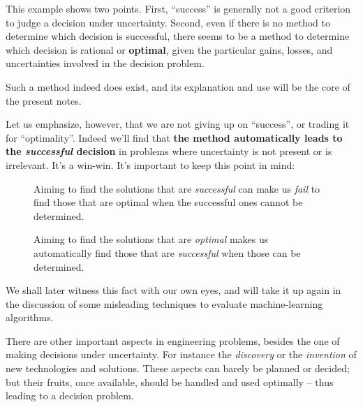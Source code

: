 \documentclass[
  a4paper,
  DIV=11,
  numbers=noendperiod,
  oneside]{scrreprt}
\begin{document}
This example shows two points. First, ``success'' is generally not a
good criterion to judge a decision under uncertainty. Second, even if
there is no method to determine which decision is successful, there
seems to be a method to determine which decision is rational or
{\textbf{optimal}}, given the particular gains, losses, and
uncertainties involved in the decision problem.

Such a method indeed does exist, and its explanation and use will be the
core of the present notes.

Let us emphasize, however, that we are not giving up on ``success'', or
trading it for ``optimality''. Indeed we'll find that \textbf{the method
automatically leads to the \emph{successful} decision} in problems where
uncertainty is not present or is irrelevant. It's a win-win. It's
important to keep this point in mind:

\begin{figure}

\begin{tcolorbox}[enhanced jigsaw, arc=.35mm, colback=white, bottomrule=.15mm, bottomtitle=1mm, breakable, opacityback=0, toptitle=1mm, toprule=.15mm, rightrule=.15mm, colframe=quarto-callout-note-color-frame, leftrule=.75mm, left=2mm, opacitybacktitle=0.6, titlerule=0mm, colbacktitle=quarto-callout-note-color!10!white, title={}, coltitle=black]

{Aiming to find the solutions that are \emph{successful} can make us
\emph{fail} to find those that are optimal when the successful ones
cannot be determined.}

{Aiming to find the solutions that are \emph{optimal} makes us
automatically find those that are \emph{successful} when those can be
determined.}

\end{tcolorbox}

\end{figure}

We shall later witness this fact with our own eyes, and will take it up
again in the discussion of some misleading techniques to evaluate
machine-learning algorithms.

\hfill\break

There are other important aspects in engineering problems, besides the
one of making decisions under uncertainty. For instance the
\emph{discovery} or the \emph{invention} of new technologies and
solutions. These aspects can barely be planned or decided; but their
fruits, once available, should be handled and used optimally -- thus
leading to a decision problem.
\end{document}
